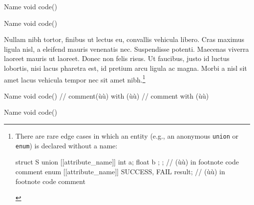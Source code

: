 \noindent\begin{minipage}{.45\textwidth}
\begin{emcppslisting}[language=C++, caption=code 1,frame=tb]{Name}
void code()
{

}
\end{emcppslisting}
\end{minipage}\hfill
\begin{minipage}{.45\textwidth}
\begin{emcppslisting}[language=C++, caption=code 2,frame=tb]{Name}
void code()
{

}
\end{emcppslisting}
\end{minipage}

Nullam nibh tortor, finibus ut lectus eu, convallis vehicula libero. Cras maximus ligula nisl, a eleifend mauris venenatis nec. Suspendisse potenti. Maecenas viverra laoreet mauris ut laoreet. Donec non felis risus. Ut faucibus, justo id luctus lobortis, nisi lacus pharetra est, id pretium arcu ligula ac magna. Morbi a nisl sit amet lacus vehicula tempor nec sit amet nibh.{\cprotect\footnote{There are rare edge cases in which an
entity (e.g., an anonymous \lstinline!union! or \lstinline!enum!) is
declared without a name:
\begin{emcppslisting}[style=footcode,]
struct S { union [[attribute_name]] { int a; float b }; };  // (ù{}ù) in footnote code comment
enum [[attribute_name]] { SUCCESS, FAIL } result;  //  (ù{}ù) in footnote code comment
\end{emcppslisting} \vspace*{-1ex}
      }}


\noindent\begin{minipage}{.45\textwidth}
\begin{emcppslisting}[language=C++, caption=code 1 with a long and wrapping title,frame=tb]{Name}
void code()  // comment(ù{\footnotemark}ù) with (ù{}ù)
{
// comment with (ù{}ù)
}
\end{emcppslisting}
\end{minipage}\hfill
\begin{minipage}{.45\textwidth}
\begin{emcppslisting}[language=C++, caption=code 2 with a long and wrapping title,frame=tb]{Name}
void code()
{

}
\end{emcppslisting}
\end{minipage}

